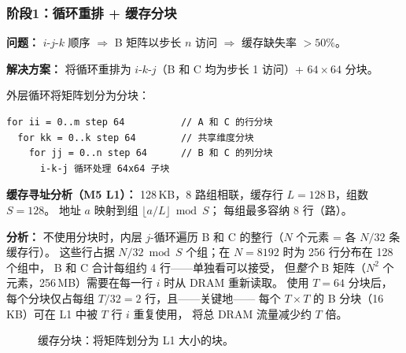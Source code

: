\documentclass[11pt,a4paper]{article}
\begin{document}
\subsubsection{阶段1：循环重排 + 缓存分块}

\textbf{问题：} $i$-$j$-$k$ 顺序 $\Rightarrow$ B 矩阵以步长 $n$ 访问 $\Rightarrow$ 缓存缺失率 $>50\%$。

\textbf{解决方案：} 将循环重排为 $i$-$k$-$j$（B 和 C 均为步长 1 访问）+ $64\times64$ 分块。

外层循环将矩阵划分为分块：
\begin{lstlisting}[language={},basicstyle=\ttfamily\scriptsize,frame=single,numbers=none]
for ii = 0..m step 64          // A 和 C 的行分块
  for kk = 0..k step 64        // 共享维度分块
    for jj = 0..n step 64      // B 和 C 的列分块
      i-k-j 循环处理 64x64 子块
\end{lstlisting}

\textbf{缓存寻址分析（M5 L1）：}
128\,KB，8 路组相联，缓存行 $L{=}128$\,B，组数 $S{=}128$。
地址 $a$ 映射到组 $\lfloor a/L \rfloor \bmod S$；
每组最多容纳 8 行（路）。

\textbf{分析：}
不使用分块时，内层 $j$-循环遍历 B 和 C 的整行（$N$ 个元素 = 各 $N/32$ 条缓存行）。
这些行占据 $N/32 \bmod S$ 个组；在 $N{=}8192$ 时为 256 行分布在 128 个组中，
B 和 C 合计每组约 4 行——单独看可以接受，
但\emph{整个} B 矩阵（$N^2$ 个元素，256\,MB）需要在每一行 $i$ 时从 DRAM 重新读取。
使用 $T{=}64$ 分块后，每个分块仅占每组 $T/32{=}2$ 行，且——关键地——
每个 $T{\times}T$ 的 B 分块（16\,KB）可在 L1 中被 $T$ 行 $i$ 重复使用，
将总 DRAM 流量减少约 $T$ 倍。

\begin{figure}[H]
\centering
{}
\caption{缓存分块：将矩阵划分为 L1 大小的块。}
\end{figure}
\end{document}

